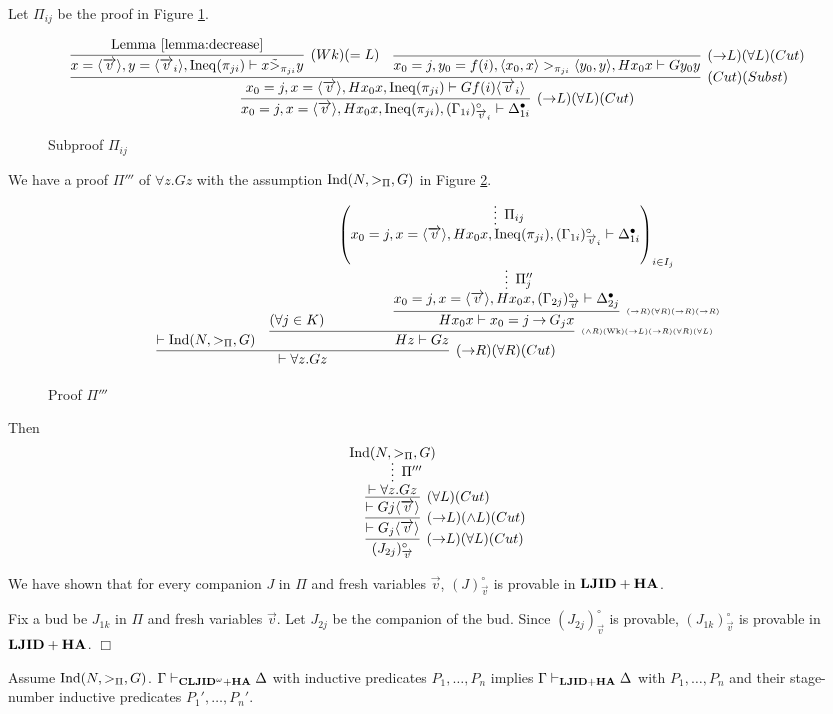 Let $\Pi_{ij}$ be the proof in Figure \ref{fig:3}.
\begin{figure}[t]
{\tiny
\[
\infer[(\imp L)(\forall L)(Cut)]{x_0=j,x=\<\Vec v\>,Hx_0x,\Ineq(\pi_{ji}),(\Gamma_{1i})^\circ_{\Vec v_i} \prove \Delta^\bullet_{1i}}{
\infer[(Cut)(Subst)]{x_0=j,x=\<\Vec v\>,Hx_0x,\Ineq(\pi_{ji}) \prove Gf(i)\<\Vec v_i\>}{
	\infer[(Wk)(=L)]{x=\<\Vec v\>,y=\<\Vec v_i\>,\Ineq(\pi_{ji}) \prove x \tilde>_{\pi_{ji}} y}{\hbox{Lemma \ref{lemma:decrease}}}
	&
	\infer[(\imp L)(\forall L)(Cut)]{x_0=j,y_0=f(i),
	\<x_0,x\> >_{\pi_{ji}} \<y_0,y\>, Hx_0x \prove Gy_0y}{}
}}
\]
}
\caption{Subproof $\Pi_{ij}$}\label{fig:3}
\end{figure}
We have a proof $\Pi'''$ of $\forall z.Gz$ 
with the assumption ${\rm Ind}(N,>_\Pi,G)$
in Figure \ref{fig:1}.
\begin{figure}[t]
\[
\infer[(\imp R)(\forall R)(Cut)]{\prove \forall z.Gz}{
	\prove \Ind(N,>_\Pi,G)
	&
	\infer[\hbox{\tiny $(\land R)(\Wk)(\imp L)(\imp R)(\forall R)
		(\forall L)$}]{Hz \prove Gz}{
		(\forall j \in K)
		&
		\infer[\hbox{\tiny $(\imp R)(\forall R)(\imp R)(\imp R)$}]{Hx_0x \prove x_0=j \imp G_jx}{
		\infer*[\Pi''_j]{x_0=j,x=\<\Vec v\>,Hx_0x,(\Gamma_{2j})^\circ_{\Vec v} \prove \Delta^\bullet_{2j}}{
		\left(
		\infer*[\Pi_{ij}]{x_0=j,x=\<\Vec v\>,Hx_0x,\Ineq(\pi_{ji}),(\Gamma_{1i})^\circ_{\Vec v_i} \prove \Delta^\bullet_{1i}}{}
		\right)
		_{i \in I_j}
}}}}
\]
\caption{Proof $\Pi'''$}\label{fig:1}
\end{figure}

Then
\[
\infer[(\imp L)(\forall L)(Cut)]{(J_{2j})^\circ_{\Vec v}}{
\infer[(\imp L)(\land L)(Cut)]{\prove G_j\<\Vec v\>}{
\infer[(\forall L)(Cut)]{\prove Gj\<\Vec v\>}{
\infer*[\Pi''']{\prove \forall z.Gz}{
\Ind(N,>_\Pi,G)
}}}}
\]

We have shown that 
for every companion $J$ in $\Pi$ and fresh variables $\Vec v$,
$(J)^\circ_{\Vec v}$ is provable in ${{\bf LJID}+{\bf HA}}$.

Fix a bud be $J_{1k}$ in $\Pi$ and fresh variables $\Vec v$.
Let $J_{2j}$ be the companion of the bud.
Since $(J_{2j})^\circ_{\Vec v}$ is provable, 
$(J_{1k})^\circ_{\Vec v}$ is provable in ${{\bf LJID}+{\bf HA}}$.
$\Box$

\begin{Prop}\label{prop:assumeInd}
Assume ${\rm Ind}(N,>_\Pi,G)$.
$\Gamma \mathrel \vdash_{{\bf CLJID}^\omega+{\bf HA}} \Delta$ with inductive predicates $P_1,\ldots,P_n$
implies $\Gamma \mathrel \vdash_{{\bf LJID}+{\bf HA}} \Delta$ with $P_1,\ldots,P_n$ and their stage-number inductive predicates $P_1',\ldots,P_n'$.
\end{Prop}

